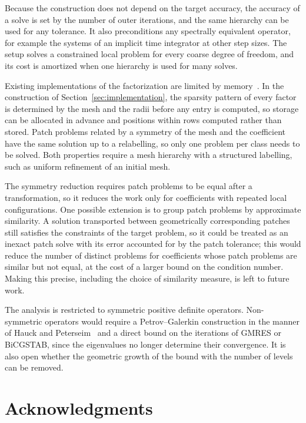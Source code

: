 \documentclass[hidelinks]{siamart}
\theoremstyle{nonumberplain}
\numberwithin{theorem}{section}
\begin{document}
Because the construction does not depend on the target accuracy, the
accuracy of a solve is set by the number of outer iterations, and the
same hierarchy can be used for any tolerance.  It also preconditions any
spectrally equivalent operator, for example the systems of an implicit
time integrator at other step sizes.  The setup solves a constrained
local problem for every coarse degree of freedom, and its cost is
amortized when one hierarchy is used for many solves.

Existing implementations of the factorization are limited by
memory~\cite{chen2021}.  In the construction of
Section~\ref{sec:implementation}, the sparsity pattern of every factor
is determined by the mesh and the radii before any entry is computed, so
storage can be allocated in advance and positions within rows computed
rather than stored.  Patch problems related by a symmetry of the mesh and
the coefficient have the same solution up to a relabelling, so only one
problem per class needs to be solved.  Both properties require a mesh
hierarchy with a structured labelling, such as uniform refinement of an
initial mesh.

The symmetry reduction requires patch problems to be equal after a
transformation, so it reduces the work only for coefficients with
repeated local configurations.  One possible extension is to group patch
problems by approximate similarity.  A solution transported between
geometrically corresponding patches still satisfies the constraints of
the target problem, so it could be treated as an inexact patch solve with
its error accounted for by the patch tolerance; this would reduce the
number of distinct problems for coefficients whose patch problems are
similar but not equal, at the cost of a larger bound on the condition
number.  Making this precise, including the choice of similarity
measure, is left to future work.

The analysis is restricted to symmetric positive definite operators.
Non-symmetric operators would require a Petrov--Galerkin construction in
the manner of Hauck and Peterseim~\cite{HauckPeterseim2021} and a direct
bound on the iterations of GMRES or BiCGSTAB, since the eigenvalues no
longer determine their convergence.  It is also open whether the
geometric growth of the bound with the number of levels can be removed.

\section*{Acknowledgments}
\end{document}
